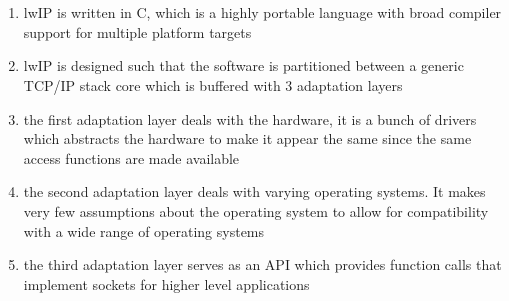 \section{}
\begin{enumerate}
  \item lwIP is written in C, which is a highly portable language with broad
    compiler support for multiple platform targets
  \item lwIP is designed such that the software is partitioned between a generic
    TCP/IP stack core which is buffered with 3 adaptation layers
  \item the first adaptation layer deals with the hardware, it is a bunch of
    drivers which abstracts the hardware to make it appear the same since the
    same access functions are made available
  \item the second adaptation layer deals with varying operating systems. It
    makes very few assumptions about the operating system to allow for
    compatibility with a wide range of operating systems
  \item the third adaptation layer serves as an API which provides function
    calls that implement sockets for higher level applications
\end{enumerate}
